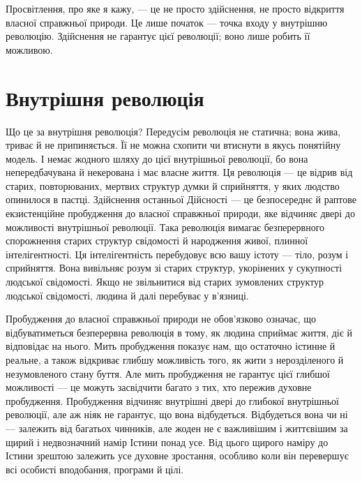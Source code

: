 Просвітлення, про яке я кажу, — це не просто здійснення, не просто відкриття власної справжньої природи. Це лише початок — точка входу у внутрішню революцію. Здійснення не гарантує цієї революції; воно лише робить її можливою.

\section*{Внутрішня революція}

Що це за внутрішня революція? Передусім революція не статична; вона жива, триває й не припиняється. Її не можна схопити чи втиснути в якусь понятійну модель. І немає жодного шляху до цієї внутрішньої революції, бо вона непередбачувана й некерована і має власне життя. Ця революція — це відрив від старих, повторюваних, мертвих структур думки й сприйняття, у яких людство опинилося в пастці. Здійснення останньої Дійсності — це безпосереднє й раптове екзистенційне пробудження до власної справжньої природи, яке відчиняє двері до можливості внутрішньої революції. Така революція вимагає безперервного спорожнення старих структур свідомості й народження живої, плинної інтелігентності. Ця інтелігентність перебудовує всю вашу істоту — тіло, розум і сприйняття. Вона вивільняє розум зі старих структур, укорінених у сукупності людської свідомості. Якщо не звільнитися від старих зумовлених структур людської свідомості, людина й далі перебуває у в'язниці.

Пробудження до власної справжньої природи не обов'язково означає, що відбуватиметься безперервна революція в тому, як людина сприймає життя, діє й відповідає на нього. Мить пробудження показує нам, що остаточно істинне й реальне, а також відкриває глибшу можливість того, як жити з нерозділеного й незумовленого стану буття. Але мить пробудження не гарантує цієї глибшої можливості — це можуть засвідчити багато з тих, хто пережив духовне пробудження. Пробудження відчиняє внутрішні двері до глибокої внутрішньої революції, але аж ніяк не гарантує, що вона відбудеться. Відбудеться вона чи ні — залежить від багатьох чинників, але жоден не є важливішим і життєвішим за щирий і недвозначний намір Істини понад усе. Від цього щирого наміру до Істини зрештою залежить усе духовне зростання, особливо коли він перевершує всі особисті вподобання, програми й цілі.


